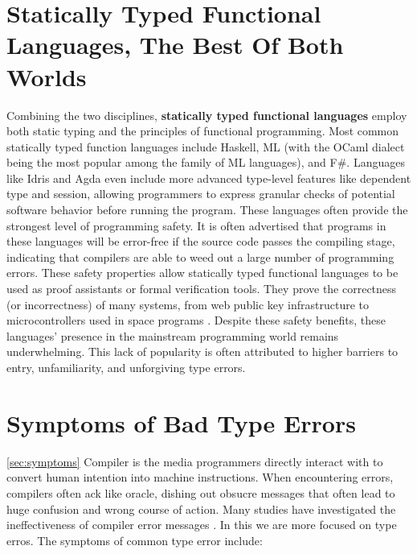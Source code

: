 \section{Statically Typed Functional Languages, The Best Of Both Worlds}
Combining the two disciplines, \textbf{statically typed functional languages} employ both static typing and the principles of functional programming. Most common statically typed function languages include Haskell,  ML (with the OCaml dialect being the most popular among the family of ML languages), and F\#. Languages like Idris and Agda even include more advanced type-level features like dependent type and session, allowing programmers to express granular checks of potential software behavior before running the program. These languages often provide the strongest level of programming safety. It is often advertised that programs in these languages will be error-free if the source code passes the compiling stage, indicating that compilers are able to weed out a large number of programming errors. These safety properties allow statically typed functional languages to be used as proof assistants or formal verification tools. They prove the correctness (or incorrectness) of many systems, from web public key infrastructure \cite{Bhargavan2021-no} to microcontrollers used in space programs \cite{Mokhov2019-zj}. Despite these safety benefits, these languages' presence in the mainstream programming world remains underwhelming. This lack of popularity is often attributed to higher barriers to entry, unfamiliarity, and unforgiving type errors.

\section{Symptoms of Bad Type Errors}
\ref{sec:symptoms}
 Compiler is the media programmers directly interact with to convert human intention into machine instructions. When encountering errors, compilers often ack like oracle, dishing out obsucre messages that often lead to huge confusion and wrong course of action. Many studies have investigated the ineffectiveness of compiler error messages \cite{}. In this we are more focused on type erros. The symptoms of common type error include:



